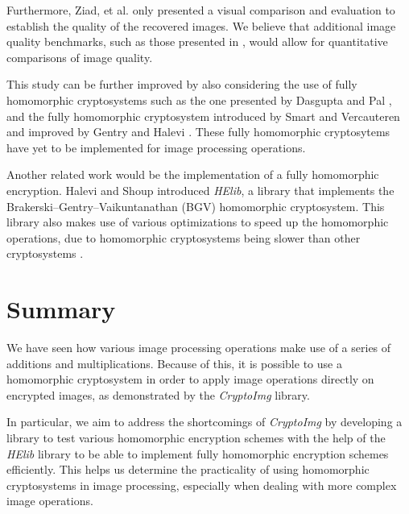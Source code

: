Furthermore, Ziad, et al. only presented a visual comparison and evaluation to establish the quality of the recovered images. We believe that additional image quality benchmarks, such as those presented in \cite{ahmed_benchmark_2016, ahmad_efficiency_2012}, would allow for quantitative comparisons of image quality.

This study can be further improved by also considering the use of fully homomorphic cryptosystems such as the one presented by Dasgupta and Pal \cite{dasgupta_design_2016}, and the fully homomorphic cryptosystem introduced by Smart and Vercauteren \cite{hutchison_fully_2010} and improved by Gentry and Halevi  \cite{hutchison_implementing_2011}. These fully homomorphic cryptosytems have yet to be implemented for image processing operations.

Another related work would be the implementation of a fully homomorphic encryption. Halevi and Shoup \cite{garay_algorithms_2014} introduced \textit{HElib}, a library that implements the Brakerski--Gentry--Vaikuntanathan (BGV) homomorphic cryptosystem. This library also makes use of various optimizations to speed up the homomorphic operations, due to homomorphic cryptosystems being slower than other cryptosystems \cite{sen_homomorphic_2013}.

\section{Summary}
We have seen how various image processing operations make use of a series of additions and multiplications. Because of this, it is possible to use a homomorphic cryptosystem in order to apply image operations directly on encrypted images, as demonstrated by the \textit{CryptoImg} library.

In particular, we aim to address the shortcomings of \textit{CryptoImg} by developing a library to test various homomorphic encryption schemes with the help of the \textit{HElib} library to be able to implement fully homomorphic encryption schemes efficiently. This helps us determine the practicality of using homomorphic cryptosystems in image processing, especially when dealing with more complex image operations.
